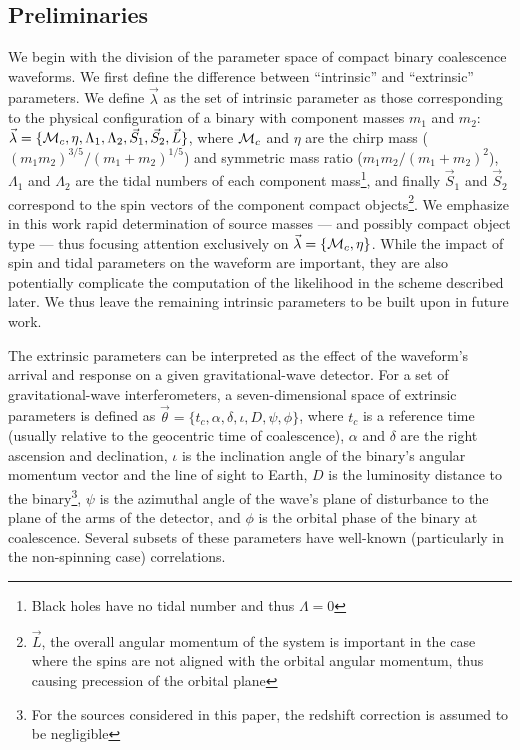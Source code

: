 \label{sec:Methods}

\newcommand\itrprm{\vec{\lambda}}
\newcommand\etrprm{\vec{\theta}}

\subsection{Preliminaries}
We begin with the division of the parameter space of compact binary coalescence waveforms. We first define the difference between ``intrinsic'' and ``extrinsic'' parameters. We define $\itrprm$ as the set of intrinsic parameter as those corresponding to the physical configuration of a binary with component masses $m_1$ and $m_2$: $\itrprm=\{\mc,\eta,\Lambda_1,\Lambda_2,\vec{S}_1,\vec{S}_2,\vec{L}\}$, where ${{\cal M}_c}$ and $\eta$ are the chirp mass ($(m_1m_2)^{3/5}/(m_1+m_2)^{1/5}$) and symmetric mass ratio ($m_1m_2/(m_1+m_2)^2$), $\Lambda_1$ and $\Lambda_2$ are the tidal numbers of each component mass\footnote{Black holes have no tidal number and thus $\Lambda=0$}, and finally $\vec{S}_1$ and $\vec{S}_2$ correspond to the spin vectors of the component compact objects\footnote{$\vec{L}$, the overall angular momentum of the system is important in the case where the spins are not aligned with the orbital angular momentum, thus causing precession of the orbital plane}. We emphasize in this work rapid determination of source masses --- and possibly compact object type --- thus focusing attention exclusively on $\itrprm=\{\mc,\eta\}$. While the impact of spin and tidal parameters on the waveform are important, they are also potentially complicate the computation of the likelihood in the scheme described later. We thus leave the remaining intrinsic parameters to be built upon in future work.

The extrinsic parameters can be interpreted as the effect of the waveform's arrival and response on a given gravitational-wave detector. For a set of gravitational-wave interferometers, a seven-dimensional space of extrinsic parameters is defined as $\etrprm=\{t_c,\alpha,\delta,\iota,D,\psi,\phi\}$, where $t_c$ is a reference time (usually relative to the geocentric time of coalescence), $\alpha$ and $\delta$ are the right ascension and declination, $\iota$ is the inclination angle of the binary's angular momentum vector and the line of sight to Earth, $D$ is the luminosity distance to the binary\footnote{For the sources considered in this paper, the redshift correction is assumed to be negligible}, $\psi$ is the azimuthal angle of the wave's plane of disturbance to the plane of the arms of the detector, and $\phi$ is the orbital phase of the binary at coalescence. Several subsets of these parameters have well-known (particularly in the non-spinning case) correlations.

